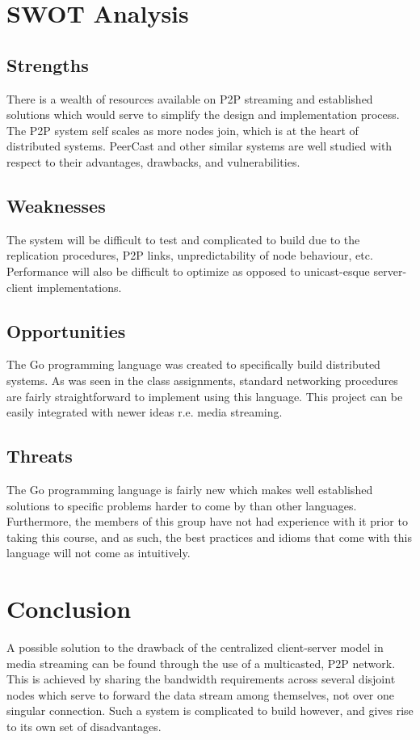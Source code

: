 \documentclass[fleqn,24pt]{SelfArx} %
\begin{document}
\section{SWOT Analysis}

\subsection{Strengths}
There is a wealth of resources available on P2P streaming and established solutions which would serve to simplify the design and implementation process. The P2P system self scales as more nodes join, which is at the heart of distributed systems. PeerCast and other similar systems are well studied with respect to their advantages, drawbacks, and vulnerabilities.

\subsection{Weaknesses}
The system will be difficult to test and complicated to build due to the replication procedures, P2P links, unpredictability of node behaviour, etc. Performance will also be difficult to optimize as opposed to unicast-esque server-client implementations.

\subsection{Opportunities}
The Go programming language was created to specifically build distributed systems. As was seen in the class assignments, standard networking procedures are fairly straightforward to implement using this language. This project can be easily integrated with newer ideas r.e. media streaming.

\subsection{Threats}
The Go programming language is fairly new which makes well established solutions to specific problems harder to come by than other languages. Furthermore, the members of this group have not had experience with it prior to taking this course, and as such, the best practices and idioms that come with this language will not come as intuitively. 

\section{Conclusion}

A possible solution to the drawback of the centralized client-server model in media streaming can be found through the use of a multicasted, P2P network. This is achieved by sharing the bandwidth requirements across several disjoint nodes which serve to forward the data stream among themselves, not over one singular connection. Such a system is complicated to build however, and gives rise to its own set of disadvantages.




\end{document}
